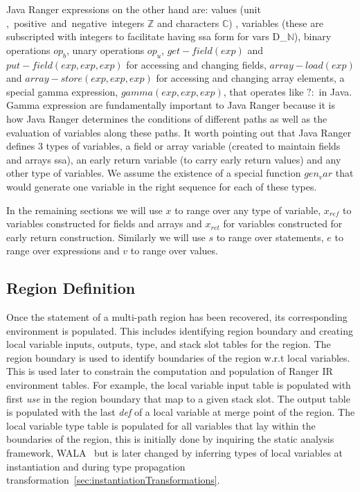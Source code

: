 Java Ranger expressions on the other hand are: values (unit \unit, positive and negative integers $\mathbb{Z}$ and characters $\mathbb{C}$) , variables (these are subscripted with integers to facilitate having ssa form for vars D_$\mathbb{N}$), binary operations $op_b$, unary operations $op_u$,  $get-field(exp)$ and $put-field(exp, exp, exp)$ for accessing and changing fields,  $array-load(exp)$ and  $array-store(exp, exp, exp)$ for accessing and changing array elements, a special gamma expression, $gamma(exp, exp, exp)$, that operates like $?:$ in Java. Gamma expression are fundamentally important to Java Ranger because it is how Java Ranger determines the conditions of different paths as well as the evaluation of variables along these paths.  
It worth pointing out that Java Ranger defines 3 types of variables, a field or array variable (created to maintain fields and arrays ssa), an early return variable (to carry early return values) and any other type of variables. We assume the existence of a special function $gen_var$ that would generate one variable in the right sequence for each of these types. 

In the remaining sections we will use $x$ to range over any type of variable, $x_{ref}$ to variables constructed for fields and arrays and $x_{ret}$ for variables constructed for early return construction. Similarly we will use $s$ to range over statements, $e$ to range over expressions and $v$ to range over values.
\iffalse
\begin{verbatim}

stmt ::= stmt ; 
   

\end{verbatim}

\vaibhav{assigned to Mike}
\mike{MWW: - we should provide an AST of the constraint language}
\fi 


\subsection{Region Definition}

Once the statement of a multi-path region has been recovered, its corresponding environment is populated.
%
This includes identifying region boundary and creating local variable inputs, outputs, type, and stack slot tables for
the region.
%
The region boundary is used to identify boundaries of the region w.r.t local variables.
%
This is used later to constrain the computation and population of Ranger IR environment tables.
%
For example, the local variable input table is populated with first \textit{use} in the region boundary that map to a given stack slot.
%
The output table is populated with the last \textit{def} of a local variable at merge point of the region.
%
The local variable type table is populated for all variables that lay within the boundaries of the region, this is initially done by
inquiring the static analysis framework, WALA~\cite{Wala} but is later changed by inferring types of local variables
at instantiation and during type propagation transformation~\ref{sec:instantiationTransformations}.

